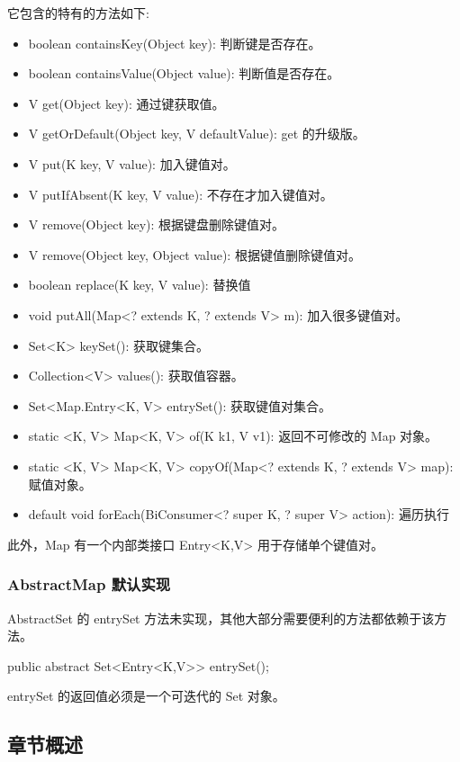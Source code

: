 它包含的特有的方法如下:
\begin{itemize}
    \item boolean containsKey(Object key): 判断键是否存在。
    \item boolean containsValue(Object value): 判断值是否存在。
    \item V get(Object key): 通过键获取值。
    \item V getOrDefault(Object key, V defaultValue): get 的升级版。
    \item V put(K key, V value): 加入键值对。
    \item V putIfAbsent(K key, V value): 不存在才加入键值对。
    \item V remove(Object key): 根据键盘删除键值对。
    \item V remove(Object key, Object value): 根据键值删除键值对。
    \item boolean replace(K key, V value): 替换值
    \item void putAll(Map<? extends K, ? extends V> m): 加入很多键值对。
    \item Set<K> keySet(): 获取键集合。
    \item Collection<V> values(): 获取值容器。
    \item Set<Map.Entry<K, V> entrySet(): 获取键值对集合。
    \item static <K, V> Map<K, V> of(K k1, V v1): 返回不可修改的 Map 对象。
    \item static <K, V> Map<K, V> copyOf(Map<? extends K, ? extends V> map): 赋值对象。
    \item default void forEach(BiConsumer<? super K, ? super V> action): 遍历执行
\end{itemize}

此外，Map 有一个内部类接口 Entry<K,V> 用于存储单个键值对。

\subsubsection{AbstractMap 默认实现}

AbstractSet 的 entrySet 方法未实现，其他大部分需要便利的方法都依赖于该方法。

\begin{Java}
public abstract Set<Entry<K,V>> entrySet();
\end{Java}

entrySet 的返回值必须是一个可迭代的 Set 对象。

\subsection*{章节概述}


